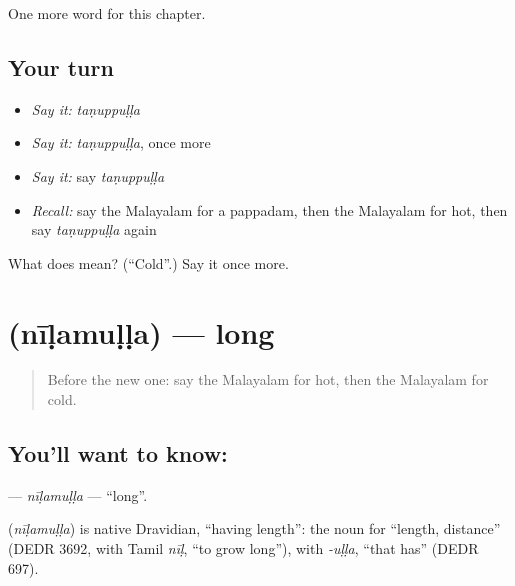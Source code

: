 \begin{grammarlens}[title={What you've built}]
One more word for this chapter.
\end{grammarlens}

\subsection*{Your turn}
\begin{itemize}
\raggedright
  \item \emph{Say it:} \emph{taṇuppuḷḷa}
  \item \emph{Say it:} \emph{taṇuppuḷḷa}, once more
  \item \emph{Say it:} say \emph{taṇuppuḷḷa}
  \item \emph{Recall:} say the Malayalam for a pappadam, then the Malayalam for hot, then say \emph{taṇuppuḷḷa} again
\end{itemize}

\begin{tcolorbox}[breakable,colback=teal!4,colframe=teal!35!black,title={Before you move on}]
What does  mean? (\textquotedblleft{}Cold\textquotedblright{}.) Say it once more.
\end{tcolorbox}
\section[\texorpdfstring{\ml{നീളമുള്ള} (nīḷamuḷḷa)}{നീളമുള്ള (nīḷamuḷḷa)}]{ (nīḷamuḷḷa) — long}

\label{lesson:ML-C164-nilamulla}



\begin{quote}
Before the new one: say the Malayalam for hot, then the Malayalam for cold.
\end{quote}

\subsection*{You'll want to know: }
\textbf{} — \emph{nīḷamuḷḷa} — \textquotedblleft{}long\textquotedblright{}.

\begin{cousinweb}
\textbf{} (\emph{nīḷamuḷḷa}) is native Dravidian, \textquotedblleft{}having length\textquotedblright{}: the noun for \textquotedblleft{}length, distance\textquotedblright{} (DEDR 3692, with Tamil \emph{nīḷ}, \textquotedblleft{}to grow long\textquotedblright{}), with \emph{-uḷḷa}, \textquotedblleft{}that has\textquotedblright{} (DEDR 697).
\end{cousinweb}

